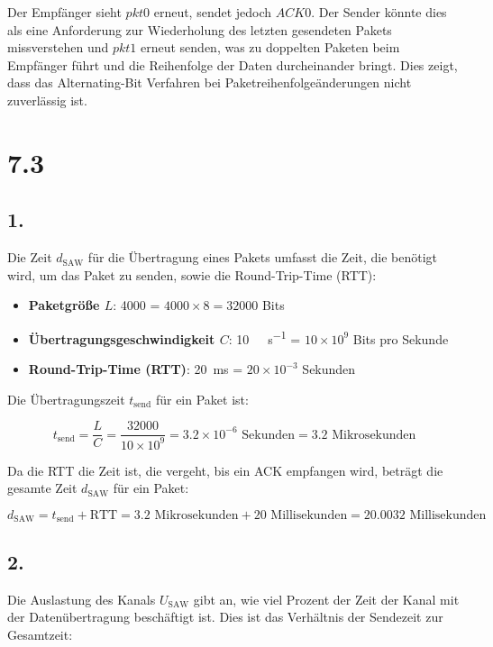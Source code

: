 \documentclass[a4paper]{scrartcl}
\begin{document}
Der Empfänger sieht \( pkt0 \) erneut, sendet jedoch \( ACK0 \). Der Sender könnte dies als eine Anforderung zur Wiederholung des letzten gesendeten Pakets missverstehen und \( pkt1 \) erneut senden, was zu doppelten Paketen beim Empfänger führt und die Reihenfolge der Daten durcheinander bringt. Dies zeigt, dass das Alternating-Bit Verfahren bei Paketreihenfolgeänderungen nicht zuverlässig ist.


\section*{7.3}
\subsection*{1.}

Die Zeit \( d_{\text{SAW}} \) für die Übertragung eines Pakets umfasst die Zeit, die benötigt wird, um das Paket zu senden, sowie die Round-Trip-Time (RTT):

\begin{itemize}
    \item \textbf{Paketgröße \( L \)}: \SI{4000}{\byte} = \( 4000 \times 8 = 32000 \) Bits
    \item \textbf{Übertragungsgeschwindigkeit \( C \)}: \SI{10}{\giga\bit\per\second} = \( 10 \times 10^9 \) Bits pro Sekunde
    \item \textbf{Round-Trip-Time (RTT)}: \SI{20}{\milli\second} = \( 20 \times 10^{-3} \) Sekunden
\end{itemize}

Die Übertragungszeit \( t_{\text{send}} \) für ein Paket ist:

\[
t_{\text{send}} = \frac{L}{C} = \frac{32000}{10 \times 10^9} = 3.2 \times 10^{-6} \text{ Sekunden} = 3.2 \text{ Mikrosekunden}
\]

Da die RTT die Zeit ist, die vergeht, bis ein ACK empfangen wird, beträgt die gesamte Zeit \( d_{\text{SAW}} \) für ein Paket:

\[
d_{\text{SAW}} = t_{\text{send}} + \text{RTT} = 3.2 \text{ Mikrosekunden} + 20 \text{ Millisekunden} = 20.0032 \text{ Millisekunden}
\]

\subsection*{2.}

Die Auslastung des Kanals \( U_{\text{SAW}} \) gibt an, wie viel Prozent der Zeit der Kanal mit der Datenübertragung beschäftigt ist. Dies ist das Verhältnis der Sendezeit zur Gesamtzeit:
\end{document}
